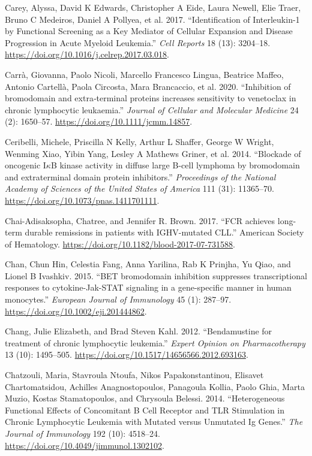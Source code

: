 \documentclass[11pt, a4paper, twosided]{book}
\newenvironment{CSLReferences}%
  {}%
  {\par}
\begin{document}
\begin{CSLReferences}{1}{0}
\leavevmode{}%
Carey, Alyssa, David K Edwards, Christopher A Eide, Laura Newell, Elie Traer, Bruno C Medeiros, Daniel A Pollyea, et al. 2017. {``{Identification of Interleukin-1 by Functional Screening as a Key Mediator of Cellular Expansion and Disease Progression in Acute Myeloid Leukemia}.''} \emph{Cell Reports} 18 (13): 3204--18. \url{https://doi.org/10.1016/j.celrep.2017.03.018}.

\leavevmode{}%
Carrà, Giovanna, Paolo Nicoli, Marcello Francesco Lingua, Beatrice Maffeo, Antonio Cartellà, Paola Circosta, Mara Brancaccio, et al. 2020. {``{Inhibition of bromodomain and extra‐terminal proteins increases sensitivity to venetoclax in chronic lymphocytic leukaemia}.''} \emph{Journal of Cellular and Molecular Medicine} 24 (2): 1650--57. \url{https://doi.org/10.1111/jcmm.14857}.

\leavevmode{}%
Ceribelli, Michele, Priscilla N Kelly, Arthur L Shaffer, George W Wright, Wenming Xiao, Yibin Yang, Lesley A Mathews Griner, et al. 2014. {``{Blockade of oncogenic I\(\kappa\)B kinase activity in diffuse large B-cell lymphoma by bromodomain and extraterminal domain protein inhibitors.}''} \emph{Proceedings of the National Academy of Sciences of the United States of America} 111 (31): 11365--70. \url{https://doi.org/10.1073/pnas.1411701111}.

\leavevmode{}%
Chai-Adisaksopha, Chatree, and Jennifer R. Brown. 2017. {``{FCR achieves long-term durable remissions in patients with IGHV-mutated CLL}.''} American Society of Hematology. \url{https://doi.org/10.1182/blood-2017-07-731588}.

\leavevmode{}%
Chan, Chun Hin, Celestia Fang, Anna Yarilina, Rab K Prinjha, Yu Qiao, and Lionel B Ivashkiv. 2015. {``{BET bromodomain inhibition suppresses transcriptional responses to cytokine-Jak-STAT signaling in a gene-specific manner in human monocytes.}''} \emph{European Journal of Immunology} 45 (1): 287--97. \url{https://doi.org/10.1002/eji.201444862}.

\leavevmode{}%
Chang, Julie Elizabeth, and Brad Steven Kahl. 2012. {``{Bendamustine for treatment of chronic lymphocytic leukemia}.''} \emph{Expert Opinion on Pharmacotherapy} 13 (10): 1495--505. \url{https://doi.org/10.1517/14656566.2012.693163}.

\leavevmode{}%
Chatzouli, Maria, Stavroula Ntoufa, Nikos Papakonstantinou, Elisavet Chartomatsidou, Achilles Anagnostopoulos, Panagoula Kollia, Paolo Ghia, Marta Muzio, Kostas Stamatopoulos, and Chrysoula Belessi. 2014. {``{Heterogeneous Functional Effects of Concomitant B Cell Receptor and TLR Stimulation in Chronic Lymphocytic Leukemia with Mutated versus Unmutated Ig Genes}.''} \emph{The Journal of Immunology} 192 (10): 4518--24. \url{https://doi.org/10.4049/jimmunol.1302102}.


\end{CSLReferences}
\end{document}
